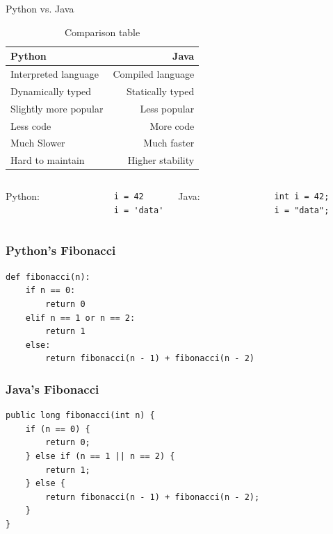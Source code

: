 \documentclass[aspectratio=169, 14pt]{beamer}
\begin{document}
\begin{frame}{Python vs. Java}
    \begin{table}
        \caption{Comparison table}
        \begin{tabular}{lr}
          \toprule
          Python & Java\\
          \midrule
          Interpreted language & Compiled language\\
          Dynamically typed & Statically typed\\
          Slightly more popular & Less popular\\
          Less code & More code\\
          Much Slower & Much faster \\
          Hard to maintain & Higher stability \\
          \bottomrule
        \end{tabular}
    \end{table}
\end{frame}

\begin{frame}[fragile]
    \begin{columns}
        Python:
        \begin{verbatim}
            i = 42
            i = 'data'
        \end{verbatim}
    
          Java:
          \begin{verbatim}
            int i = 42;
            i = "data";
        \end{verbatim}
      \end{columns}
\end{frame}

\begin{frame}[fragile]
    \frametitle{Python's Fibonacci}
    \begin{verbatim}
def fibonacci(n):
    if n == 0:
        return 0
    elif n == 1 or n == 2:
        return 1
    else:
        return fibonacci(n - 1) + fibonacci(n - 2)        
    \end{verbatim}
\end{frame}

\begin{frame}[fragile]
    \frametitle{Java's Fibonacci}
    \begin{verbatim}
public long fibonacci(int n) {
    if (n == 0) {
        return 0;
    } else if (n == 1 || n == 2) {
        return 1;
    } else {
        return fibonacci(n - 1) + fibonacci(n - 2);
    }
}    
    \end{verbatim}
\end{frame}
\end{document}
